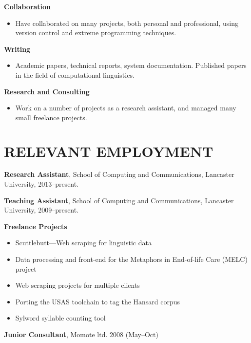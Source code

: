 \documentclass{res}
\begin{document}
\begin{resume}
  {\bf Collaboration}
    \begin{itemize}
      \item[] Have collaborated on many projects, both personal and professional, using
          version control and extreme programming techniques.
      \end{itemize}

  {\bf Writing}
    \begin{itemize} %
      \item[] Academic papers, technical reports, system documentation.
        Published papers in the field of computational linguistics.
      \end{itemize}


   {\bf  Research and Consulting} 
        \begin{itemize}
        \item[] Work on a number of projects as a research assistant, and managed many small freelance projects.
       \end{itemize} 
 
\section{RELEVANT EMPLOYMENT} 
\vspace{0.1in} 

    {\bf Research Assistant}, 
    School of Computing and Communications, 
    Lancaster University, 
    2013--present.

    {\bf Teaching Assistant}, 
    School of Computing and Communications, 
    Lancaster University, 
    2009--present.

    {\bf Freelance Projects} 
    \begin{itemize}
        \item Scuttlebutt---Web scraping for linguistic data
        \item Data processing and front-end for the Metaphors in End-of-life Care (MELC) project
        \item Web scraping projects for multiple clients
        \item Porting the USAS toolchain to tag the Hansard corpus
        \item Sylword syllable counting tool
    \end{itemize}
    
    {\bf Junior Consultant}, 
    Momote ltd.
    2008 (May--Oct)


\end{resume}
\end{document}
